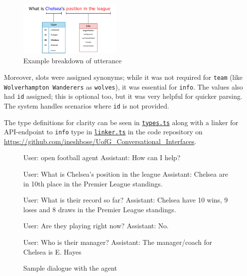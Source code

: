 \documentclass[10pt,a4paper,twocolumn]{article}
\begin{document}
\begin{figure}[h]
    \centering
    \includegraphics[width=0.45\textwidth]{assets/utterance-example.pdf}
    \caption*{Example breakdown of utterance}
\end{figure}

Moreover, slots were assigned synonyms; while it was not required for \texttt{team} (like \texttt{Wolverhampton Wanderers} as \texttt{wolves}), it was essential for \texttt{info}. The values also had \texttt{id} assigned; this is optional too, but it was very helpful for quicker parsing. The system handles scenarios where \texttt{id} is not provided.

The type definitions for clarity can be seen in \href{https://github.com/ineshbose/UofG_Conversational_Interfaces/blob/master/packages/api/types.ts}{\texttt{types.ts}} along with a linker for API-endpoint to \texttt{info} type in \href{https://github.com/ineshbose/UofG_Conversational_Interfaces/blob/master/packages/api/intent/linker.ts}{\texttt{linker.ts}} in the code repository on \href{https://github.com/ineshbose/UofG_Conversational_Interfaces}{https://github.com/ineshbose/UofG\_Conversational\_Interfaces}.

\begin{figure}[h]
    \vspace{1cm}
    \centering
    \begin{code}
  User: open football agent
  Assistant: How can I help?

  User: What is Chelsea's position in the league
  Assistant: Chelsea are in 10th place
    in the Premier League standings.

  User: What is their record so far?
  Assistant: Chelsea have 10 wins, 9 loses and
    8 draws in the Premier League standings.

  User: Are they playing right now?
  Assistant: No.

  User: Who is their manager?
  Assistant: The manager/coach for Chelsea
    is E. Hayes
    \end{code}
    \caption*{Sample dialogue with the agent}
    \vspace{1cm}
\end{figure}
\end{document}
